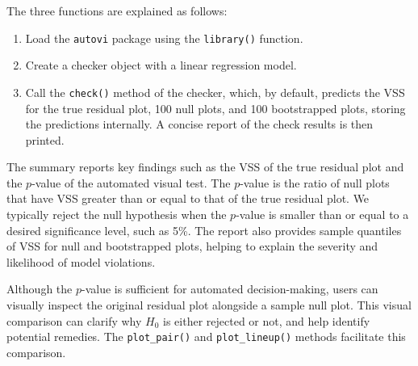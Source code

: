 \documentclass[
doublespace,
  times]{anzsauth}
\newenvironment{Shaded}{\begin{snugshade}}{\end{snugshade}}
\newcommand{\FunctionTok}[1]{\textcolor[rgb]{0.28,0.35,0.67}{#1}}
\newcommand{\NormalTok}[1]{\textcolor[rgb]{0.00,0.23,0.31}{#1}}
\newcommand{\SpecialCharTok}[1]{\textcolor[rgb]{0.37,0.37,0.37}{#1}}
\providecommand{\tightlist}{%
  \setlength{\itemsep}{0pt}\setlength{\parskip}{0pt}}\usepackage{longtable,booktabs,array}
\begin{document}
The three functions are explained as follows:

\begin{enumerate}
\def\labelenumi{\arabic{enumi}.}
\tightlist
\item
  Load the \texttt{autovi} package using the \texttt{library()}
  function.
\item
  Create a checker object with a linear regression model.
\item
  Call the \texttt{check()} method of the checker, which, by default,
  predicts the VSS for the true residual plot, 100 null plots, and 100
  bootstrapped plots, storing the predictions internally. A concise
  report of the check results is then printed.
\end{enumerate}

The summary reports key findings such as the VSS of the true residual
plot and the \(p\)-value of the automated visual test. The \(p\)-value
is the ratio of null plots that have VSS greater than or equal to that
of the true residual plot. We typically reject the null hypothesis when
the \(p\)-value is smaller than or equal to a desired significance
level, such as 5\%. The report also provides sample quantiles of VSS for
null and bootstrapped plots, helping to explain the severity and
likelihood of model violations.

Although the \(p\)-value is sufficient for automated decision-making,
users can visually inspect the original residual plot alongside a sample
null plot. This visual comparison can clarify why \(H_0\) is either
rejected or not, and help identify potential remedies. The
\texttt{plot\_pair()} and \texttt{plot\_lineup()} methods facilitate
this comparison.

\begin{Shaded}
\end{Shaded}
\end{document}
